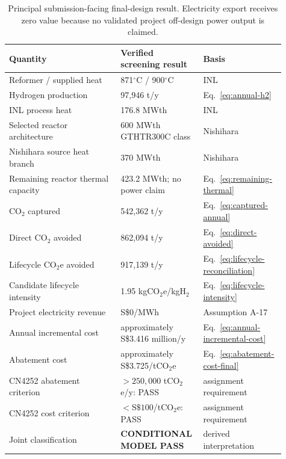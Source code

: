 \begin{table}[htbp]\centering\small
\caption{Principal submission-facing final-design result. Electricity export receives zero value because no validated project off-design power output is claimed.}
\label{tab:final-result}
\begin{tabular}{p{0.39\linewidth}p{0.27\linewidth}p{0.25\linewidth}}
\toprule
Quantity & Verified screening result & Basis \\
\midrule
Reformer / supplied heat & 871$^\circ$C / 900$^\circ$C & INL~\cite{inltev953,inltev961} \\
Hydrogen production & 97,946 t/y & Eq.~\ref{eq:annual-h2} \\
INL process heat & 176.8 MWth & INL~\cite{inltev961} \\
Selected reactor architecture & 600 MWth GTHTR300C class & Nishihara~\cite{nishihara2007potential} \\
Nishihara source heat branch & 370 MWth & Nishihara~\cite{nishihara2007potential} \\
Remaining reactor thermal capacity & 423.2 MWth; no power claim & Eq.~\ref{eq:remaining-thermal} \\
CO$_2$ captured & 542,362 t/y & Eq.~\ref{eq:captured-annual} \\
Direct CO$_2$ avoided & 862,094 t/y & Eq.~\ref{eq:direct-avoided} \\
Lifecycle CO$_2$e avoided & 917,139 t/y & Eq.~\ref{eq:lifecycle-reconciliation} \\
Candidate lifecycle intensity & 1.95 kgCO$_2$e/kgH$_2$ & Eq.~\ref{eq:lifecycle-intensity} \\
Project electricity revenue & S\$0/MWh & Assumption A-17 \\
Annual incremental cost & approximately S\$3.416 million/y & Eq.~\ref{eq:annual-incremental-cost} \\
Abatement cost & approximately S\$3.725/tCO$_2$e & Eq.~\ref{eq:abatement-cost-final} \\
CN4252 abatement criterion & $>250,000$ tCO$_2$e/y: PASS & assignment requirement \\
CN4252 cost criterion & $<\mathrm{S\$}100$/tCO$_2$e: PASS & assignment requirement \\
Joint classification & \textbf{CONDITIONAL MODEL PASS} & derived interpretation \\
\bottomrule
\end{tabular}
\end{table}

